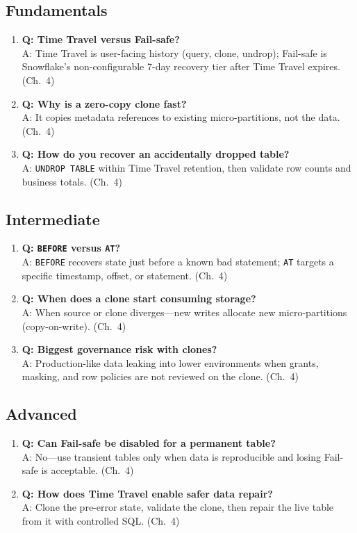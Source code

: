 \subsection{Fundamentals}
\begin{enumerate}
    \item \textbf{Q: Time Travel versus Fail-safe?}\\
    A: Time Travel is user-facing history (query, clone, undrop); Fail-safe is Snowflake's non-configurable 7-day recovery tier after Time Travel expires. (Ch.~4)
    \item \textbf{Q: Why is a zero-copy clone fast?}\\
    A: It copies metadata references to existing micro-partitions, not the data. (Ch.~4)
    \item \textbf{Q: How do you recover an accidentally dropped table?}\\
    A: \texttt{UNDROP TABLE} within Time Travel retention, then validate row counts and business totals. (Ch.~4)
\end{enumerate}

\subsection{Intermediate}
\begin{enumerate}
    \item \textbf{Q: \texttt{BEFORE} versus \texttt{AT}?}\\
    A: \texttt{BEFORE} recovers state just before a known bad statement; \texttt{AT} targets a specific timestamp, offset, or statement. (Ch.~4)
    \item \textbf{Q: When does a clone start consuming storage?}\\
    A: When source or clone diverges---new writes allocate new micro-partitions (copy-on-write). (Ch.~4)
    \item \textbf{Q: Biggest governance risk with clones?}\\
    A: Production-like data leaking into lower environments when grants, masking, and row policies are not reviewed on the clone. (Ch.~4)
\end{enumerate}

\subsection{Advanced}
\begin{enumerate}
    \item \textbf{Q: Can Fail-safe be disabled for a permanent table?}\\
    A: No---use transient tables only when data is reproducible and losing Fail-safe is acceptable. (Ch.~4)
    \item \textbf{Q: How does Time Travel enable safer data repair?}\\
    A: Clone the pre-error state, validate the clone, then repair the live table from it with controlled SQL. (Ch.~4)
\end{enumerate}

